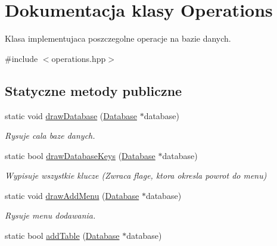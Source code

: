 \hypertarget{class_operations}{}\section{Dokumentacja klasy Operations}
\label{class_operations}


Klasa implementujaca poszczegolne operacje na bazie danych.  




{\ttfamily \#include $<$operations.\+hpp$>$}

\subsection*{Statyczne metody publiczne}
\begin{DoxyCompactItemize}
\item 
static void \mbox{\hyperlink{class_operations_a0d787c05e02fa042225975ffc31b84ad}{draw\+Database}} (\mbox{\hyperlink{class_database}{Database}} $\ast$database)
\begin{DoxyCompactList}\small\item\em Rysuje cala baze danych. \end{DoxyCompactList}\item 
\mbox{\label{class_operations_a9db1b3adc8aeb0a297910b031065ca09}} 
static bool \mbox{\hyperlink{class_operations_a9db1b3adc8aeb0a297910b031065ca09}{draw\+Database\+Keys}} (\mbox{\hyperlink{class_database}{Database}} $\ast$database)
\begin{DoxyCompactList}\small\item\em Wypisuje wszystkie klucze (Zwraca flage, ktora okresla powrot do menu) \end{DoxyCompactList}\item 
\mbox{\label{class_operations_a08dcd1587e343a6ae8fb9499aa0d5e51}} 
static void \mbox{\hyperlink{class_operations_a08dcd1587e343a6ae8fb9499aa0d5e51}{draw\+Add\+Menu}} (\mbox{\hyperlink{class_database}{Database}} $\ast$database)
\begin{DoxyCompactList}\small\item\em Rysuje menu dodawania. \end{DoxyCompactList}\item 
\mbox{\label{class_operations_aba6a02ac9ffff887460a1f7ea0423074}} 
static bool \mbox{\hyperlink{class_operations_aba6a02ac9ffff887460a1f7ea0423074}{add\+Table}} (\mbox{\hyperlink{class_database}{Database}} $\ast$database)

\end{DoxyCompactItemize}
